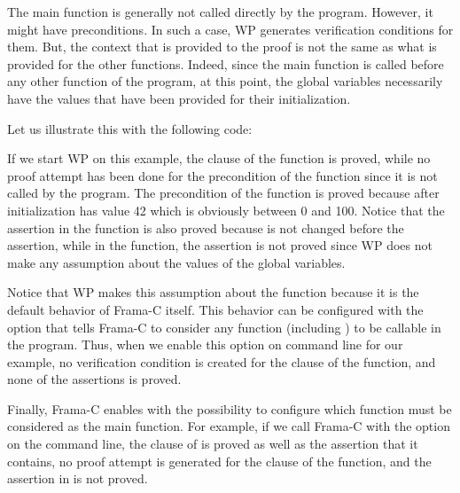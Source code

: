

The main function is generally not called directly by the program. However,
it might have preconditions. In such a case, WP generates verification
conditions for them. But, the context that is provided to the proof is not
the same as what is provided for the other functions. Indeed, since the main
function is called before any other function of the program, at this point, the
global variables necessarily have the values that have been provided for their
initialization.

Let us illustrate this with the following code:




If we start WP on this example, the  clause of the
 function is proved, while no proof attempt has been done for
the precondition of the  function since it is not called by the
program. The precondition of the  function is proved because
after initialization  has value 42 which is obviously between
0 and 100. Notice that the assertion in the  function is also
proved because  is not changed before the assertion, while in the
 function, the assertion is not proved since WP does not make any
assumption about the values of the global variables.




Notice that WP makes this assumption about the  function
because it is the default behavior of Frama-C itself. This behavior can be
configured with the option  that tells Frama-C to
consider any function (including ) to be callable in the
program. Thus, when we enable this option on command line for our example, no
verification condition is created for the  clause of the
 function, and none of the assertions is proved.




Finally, Frama-C enables with the possibility to configure which function
must be considered as the main function. For example, if we call Frama-C with
the option  on the command line, the 
clause of  is proved as well as the assertion that it contains,
no proof attempt is generated for the  clause of the
 function, and the assertion in  is not
proved.


